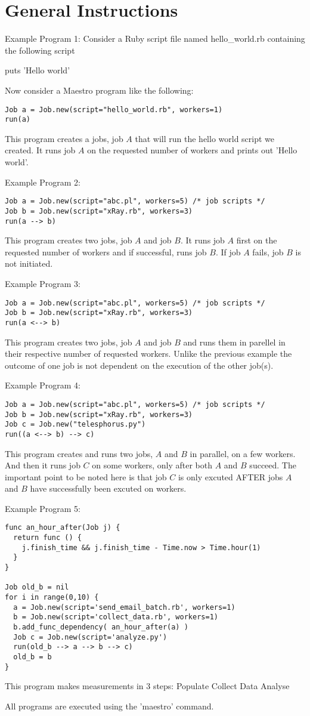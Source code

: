 \section{General Instructions}
\label{sect:general}
Example Program 1:
Consider a Ruby script file named hello_world.rb containing the following script

puts 'Hello world'

Now consider a Maestro program like the following:
\begin{lstlisting}
Job a = Job.new(script="hello_world.rb", workers=1)
run(a)
\end{lstlisting}
This program creates a jobs, job $A$ that will run the hello world script we created. 
It runs job $A$ on the requested number of workers and prints out 'Hello world'.


Example Program 2:
\begin{lstlisting}
Job a = Job.new(script="abc.pl", workers=5) /* job scripts */
Job b = Job.new(script="xRay.rb", workers=3)
run(a --> b)
\end{lstlisting}
This program creates two jobs, job $A$ and job $B$. It runs job $A$ first on the requested number of workers
and if successful, runs job $B$. If job $A$ fails, job $B$ is not initiated.

Example Program 3:
\begin{lstlisting}
Job a = Job.new(script="abc.pl", workers=5) /* job scripts */
Job b = Job.new(script="xRay.rb", workers=3)
run(a <--> b)
\end{lstlisting}
This program creates two jobs, job $A$ and job $B$ and runs them in parellel in their respective number of requested workers.
Unlike the previous example the outcome of one job is not dependent on the execution of the other job(s).

Example Program 4: 
\begin{lstlisting}
Job a = Job.new(script="abc.pl", workers=5) /* job scripts */
Job b = Job.new(script="xRay.rb", workers=3)
Job c = Job.new("telesphorus.py")
run((a <--> b) --> c)
\end{lstlisting}
This program creates and runs two jobs, $A$ and $B$ in parallel, on a few
workers. And then it runs job $C$ on some workers, only after both $A$
and $B$ succeed. The important point to be noted here is that job $C$ is 
only excuted AFTER jobs $A$ and $B$ have successfully been excuted on workers.

Example Program 5:
\begin{lstlisting}
func an_hour_after(Job j) {
  return func () {
    j.finish_time && j.finish_time - Time.now > Time.hour(1)
  }
}

Job old_b = nil
for i in range(0,10) {
  a = Job.new(script='send_email_batch.rb', workers=1)
  b = Job.new(script='collect_data.rb', workers=1)
  b.add_func_dependency( an_hour_after(a) )
  Job c = Job.new(script='analyze.py')
  run(old_b --> a --> b --> c)
  old_b = b
}
\end{lstlisting}
This program makes measurements in 3 steps:
Populate
Collect Data
Analyse


All programs are executed using the 'maestro' command.




